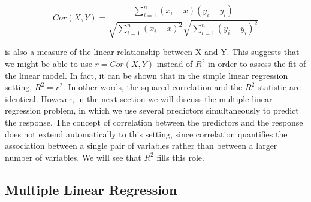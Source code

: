 \documentclass{article}
\theoremstyle{definition}
\theoremstyle{remark}
\begin{document}
	\[
	Cor(X,Y)=\frac{\sum^n_{i=1}(x_i-\bar{x})(y_i-\bar{y_i})}{\sqrt{\sum^n_{i=1}(x_i-\bar{x})^2}\sqrt{\sum^n_{i=1}(y_i-\bar{y_i})^2}}
	\]	
	
	is also a measure of the linear relationship between X and Y. This suggests that we might be able to use $r=Cor(X,Y)$ instead of $R^2$ in order to assess the fit of the linear model. In fact, it can be shown that in the simple linear regression setting, $R^2=r^2$. In other words, the squared correlation and the $R^2$ statistic are identical. However, in the next section we will discuss the multiple linear regression problem, in which we use several predictors simultaneously to predict the response. The concept of correlation between the predictors and the response does not extend automatically to this setting, since correlation quantifies the association between a single pair of variables rather than between a larger number of variables. We will see that $R^2$ fills this role.
	
	\subsection*{Multiple Linear Regression}
	
	
	
	
	
	
\end{document}

